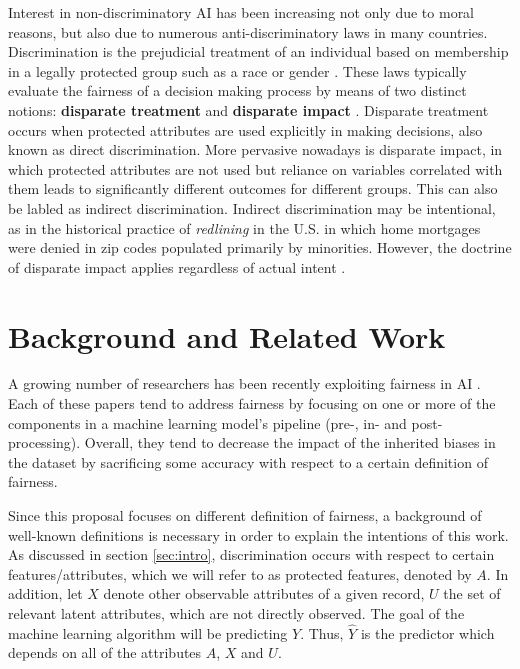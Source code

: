 \documentclass[11pt]{article}
\begin{document}
Interest in non-discriminatory AI has been increasing not only due to moral reasons, but also due to numerous anti-discriminatory laws in many countries. Discrimination is the prejudicial treatment of an individual based on membership in a legally protected group such as a race or gender \cite{calmon2017optimized}. These laws typically evaluate the fairness of a decision making process by means of two distinct notions: \textbf{disparate treatment} and \textbf{disparate impact} \cite{zafar2017fairness}. Disparate treatment occurs when protected attributes are used explicitly in making decisions, also known as direct discrimination. More pervasive nowadays is disparate impact, in which protected attributes are not used but reliance on variables correlated with them leads to significantly different outcomes for different groups. This can also be labled as indirect discrimination. Indirect discrimination may be intentional, as in the historical practice of \textit{redlining} in the U.S. in which home mortgages were denied in zip codes populated primarily by minorities. However, the doctrine of disparate impact applies regardless of actual intent \cite{calmon2017optimized}.

\section{Background and Related Work} \label{sec:background}
A growing number of researchers has been recently exploiting fairness in AI \cite{calmon2017optimized, zafar2017fairness, kusner2017counterfactual, pleiss2017fairness, chiappa2018path, dwork2017decoupled, russell2017worlds, zhang2018fairness}. Each of these papers tend to address fairness by focusing on one or more of the components in a machine learning model's pipeline (pre-, in- and post-processing). Overall, they tend to decrease the impact of the inherited biases in the dataset by sacrificing some accuracy with respect to a certain definition of fairness.

Since this proposal focuses on different definition of fairness, a background of well-known definitions is necessary in order to explain the intentions of this work. As discussed in section \ref{sec:intro}, discrimination occurs with respect to certain features/attributes, which we will refer to as protected features, denoted by $A$. In addition, let $X$ denote other observable attributes of a given record, $U$ the set of relevant latent attributes, which are not directly observed. The goal of the machine learning algorithm will be predicting $Y$. Thus, $\hat{Y}$ is the predictor which depends on all of the attributes $A$, $X$ and $U$.
\end{document}
